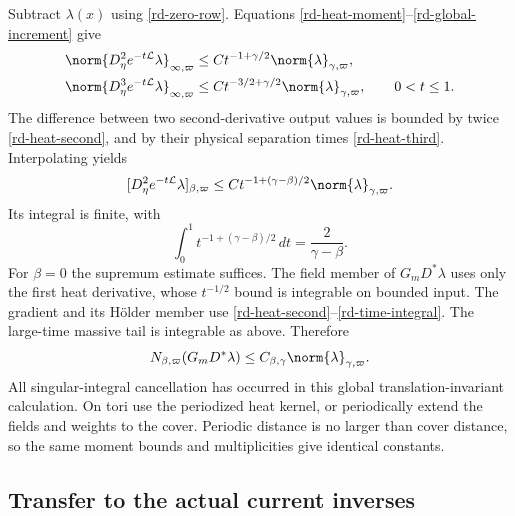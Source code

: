 Subtract $\lambda(x)$ using \eqref{rd-zero-row}. Equations
\eqref{rd-heat-moment}--\eqref{rd-global-increment} give
\begin{align}
 \norm{D_\eta^2e^{-t\mathcal L}\lambda}_{\infty,\varpi}
   &\le Ct^{-1+\gamma/2}\norm{\lambda}_{\gamma,\varpi},
       \label{rd-heat-second}\\
 \norm{D_\eta^3e^{-t\mathcal L}\lambda}_{\infty,\varpi}
   &\le Ct^{-3/2+\gamma/2}\norm{\lambda}_{\gamma,\varpi},
                   \qquad0<t\le1.
       \label{rd-heat-third}
\end{align}
The difference between two second-derivative output values is
bounded by twice \eqref{rd-heat-second}, and by their physical
separation times \eqref{rd-heat-third}. Interpolating yields
\begin{equation}\label{rd-heat-holder}
 [D_\eta^2e^{-t\mathcal L}\lambda]_{\beta,\varpi}
       \le Ct^{-1+(\gamma-\beta)/2}
                                  \norm{\lambda}_{\gamma,\varpi}.
\end{equation}
Its integral is finite, with
\begin{equation}\label{rd-time-integral}
 \int_0^1t^{-1+(\gamma-\beta)/2}\,dt
                      =\frac2{\gamma-\beta}.
\end{equation}
For $\beta=0$ the supremum estimate suffices. The field member of
$G_mD^*\lambda$ uses only the first heat derivative, whose
$t^{-1/2}$ bound is integrable on bounded input. The gradient and
its H\"older member use
\eqref{rd-heat-second}--\eqref{rd-time-integral}. The large-time
massive tail is integrable as above. Therefore
\begin{equation}\label{rd-massive-bound}
 N_{\beta,\varpi}(G_mD^*\lambda)
                  \le C_{\beta,\gamma}
                                  \norm{\lambda}_{\gamma,\varpi}.
\end{equation}
All singular-integral cancellation has occurred in this global
translation-invariant calculation. On tori use the periodized heat
kernel, or periodically extend the fields and weights to the cover.
Periodic distance is no larger than cover distance, so the same
moment bounds and multiplicities give identical constants.

\subsection{Transfer to the actual current inverses}

